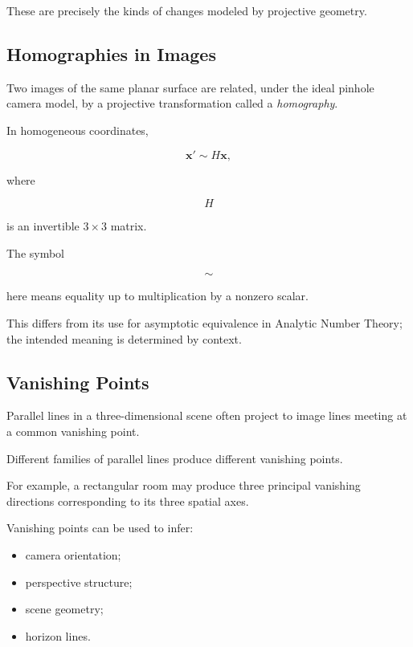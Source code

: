 These are precisely the kinds of changes modeled by projective geometry.

\subsection{Homographies in Images}
\label{subsec:image-homographies}

Two images of the same planar surface are related, under the ideal pinhole
camera model, by a projective transformation called a \emph{homography}.

In homogeneous coordinates,

\[
\boxed{
\mathbf{x}'
\sim
H\mathbf{x},
}
\]

where

\[
H
\]

is an invertible \(3\times3\) matrix.

The symbol

\[
\sim
\]

here means equality up to multiplication by a nonzero scalar.

This differs from its use for asymptotic equivalence in Analytic Number
Theory; the intended meaning is determined by context.

\subsection{Vanishing Points}
\label{subsec:vanishing-points}

Parallel lines in a three-dimensional scene often project to image lines
meeting at a common vanishing point.

Different families of parallel lines produce different vanishing points.

For example, a rectangular room may produce three principal vanishing
directions corresponding to its three spatial axes.

Vanishing points can be used to infer:

\begin{itemize}
    \item camera orientation;
    \item perspective structure;
    \item scene geometry;
    \item horizon lines.
\end{itemize}

